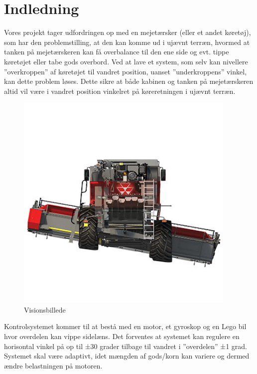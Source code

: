 \graphicspath{{Chapters/Indledning/}}

\section{Indledning}
Vores projekt tager udfordringen op med en mejetærsker (eller et andet køretøj), som har den problemstilling, at den kan komme ud i ujævnt terræn, hvormed at tanken på mejetærskeren kan få overbalance til den ene side og evt. tippe køretøjet eller tabe gods overbord. Ved at lave et system, som selv kan nivellere ”overkroppen” af køretøjet til vandret position, uanset ”underkroppens” vinkel, kan dette problem løses. Dette sikre at både kabinen og tanken på mejetærskeren altid vil være i vandret position vinkelret på køreretningen i ujævnt terræn.

\begin{figure}[H]
	\centering
	\includegraphics[width = 300pt]{Img/Visionbillede}
	\caption{Visionsbillede}
	\label{fig:konceptbillede}
\end{figure}

Kontrolsystemet kommer til at bestå med en motor, et gyroskop og en Lego bil hvor overdelen kan vippe sidelæns. Det forventes at systemet kan regulere en horisontal vinkel på op til ±30 grader tilbage til vandret i ”overdelen” ±1 grad. Systemet skal være adaptivt, idet mængden af gods/korn kan variere og dermed ændre belastningen på motoren.   \\ 

\newpage

